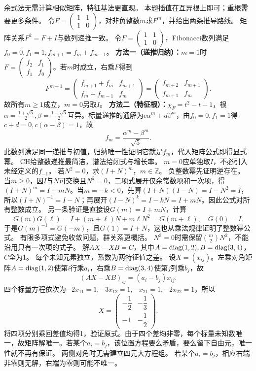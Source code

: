 {余式法无需计算相似矩阵，特征基法更直观。}
{本题插值在互异根上即可；重根需要更多条件。}
{令$F=\begin{pmatrix}1&1\\1&0\end{pmatrix}$，对非负整数$m$求$F^m$，并给出两条推导路线。}
{矩阵关系$F^2=F+I$与数列递推一致。}
{令$F=\begin{pmatrix}1&1\\1&0\end{pmatrix}$，Fibonacci数列满足$f_0=0,f_1=1,f_{m+1}=f_m+f_{m-1}$。
\textbf{方法一（递推归纳）：}$m=1$时$F=\begin{pmatrix}f_2&f_1\\f_1&f_0\end{pmatrix}$。若$m$时成立，右乘$F$得到
\[F^{m+1}=\begin{pmatrix}f_{m+1}+f_m&f_{m+1}\\f_m+f_{m-1}&f_m\end{pmatrix}
=\begin{pmatrix}f_{m+2}&f_{m+1}\\f_{m+1}&f_m\end{pmatrix}.\]
故所有$m\ge1$成立，$m=0$另取$I$。
\textbf{方法二（特征根）：}$\chi_F=t^2-t-1$，根$\alpha=\frac{1+\sqrt5}{2},\beta=\frac{1-\sqrt5}{2}$互异。标量递推的通解为$c\alpha^m+d\beta^m$，由$f_0=0,f_1=1$得$c+d=0,c(\alpha-\beta)=1$，故
\[f_m=\dfrac{\alpha^m-\beta^m}{\sqrt5}.\]
此数列满足同一递推与初值，归纳唯一性证明它就是$f_m$，代入矩阵公式即得显式幂。}
{CH给整数递推最简洁，谱法给闭式与增长率。}
{$m=0$应单独取$I$，不必引入未经定义的$f_{-1}$。}
{若$N^2=0$，求$(I+N)^m$，$m\in\mathbb Z$。}
{负整数幂先证明逆存在。}
{当$m\ge0$，因$I$与$N$可交换且$N^2=0$，二项式展开仅余常数项和一次项，得$(I+N)^m=I+mN$。当$m=-k<0$，先算$(I+N)(I-N)=I-N^2=I$，所以$(I+N)^{-1}=I-N$；再展开$(I-N)^k=I-kN=I+mN$。因此公式对所有整数成立。
另一条验证是直接设$G(m)=I+mN$，计算
\[G(m)G(\ell)=I+(m+\ell)N+m\ell N^2=G(m+\ell),\quad G(0)=I.\]
于是$G(m)^{-1}=G(-m)$，且$G(1)=I+N$，这也从乘法规律证明了整数幂公式。}
{有限多项式避免收敛问题，群关系更概括。}
{$N^3=0$时需保留$\binom m2N^2$，不能沿用只有一次项的式子。}
{解$AX-XB=C$，其中$A=\operatorname{diag}(1,2),B=\operatorname{diag}(3,4)$，$C$全为1。}
{每个未知元素独立，系数为两特征值之差。}
{设$X=(x_{ij})$。左乘对角矩阵$A=\operatorname{diag}(1,2)$使第$i$行乘$a_i$，右乘$B=\operatorname{diag}(3,4)$使第$j$列乘$b_j$，故
\[(AX-XB)_{ij}=(a_i-b_j)x_{ij}.\]
四个标量方程依次为$-2x_{11}=1,-3x_{12}=1,-x_{21}=1,-2x_{22}=1$，所以
\[X=\begin{pmatrix}-\dfrac{1}{2}&-\dfrac{1}{3}\\-1&-\dfrac{1}{2}\end{pmatrix}.\]
将四项分别乘回差值均得1，验证原式。由于四个差均非零，每个标量未知数唯一，故矩阵解唯一。若某个$a_i=b_j$，该位置方程要么矛盾，要么留下自由元，唯一性就不再有保证。}
{两侧对角时无需建立四元大方程组。}
{若某个$a_i=b_j$，相应右端非零则无解，右端为零则可能不唯一。}
